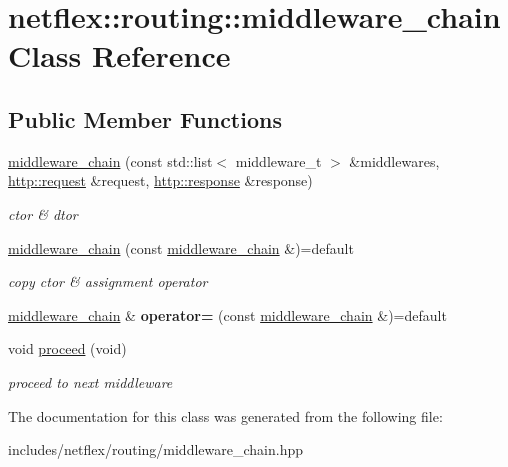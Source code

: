 \hypertarget{classnetflex_1_1routing_1_1middleware__chain}{}\section{netflex\+:\+:routing\+:\+:middleware\+\_\+chain Class Reference}
\label{classnetflex_1_1routing_1_1middleware__chain}
\subsection*{Public Member Functions}
\begin{DoxyCompactItemize}
\item 
\mbox{\label{classnetflex_1_1routing_1_1middleware__chain_a1ca46e620562de94f0f18bda55d5dc6b}} 
\hyperlink{classnetflex_1_1routing_1_1middleware__chain_a1ca46e620562de94f0f18bda55d5dc6b}{middleware\+\_\+chain} (const std\+::list$<$ middleware\+\_\+t $>$ \&middlewares, \hyperlink{classnetflex_1_1http_1_1request}{http\+::request} \&request, \hyperlink{classnetflex_1_1http_1_1response}{http\+::response} \&response)
\begin{DoxyCompactList}\small\item\em ctor \& dtor \end{DoxyCompactList}\item 
\mbox{\label{classnetflex_1_1routing_1_1middleware__chain_ae9735fec43573278a01312692c5aff55}} 
\hyperlink{classnetflex_1_1routing_1_1middleware__chain_ae9735fec43573278a01312692c5aff55}{middleware\+\_\+chain} (const \hyperlink{classnetflex_1_1routing_1_1middleware__chain}{middleware\+\_\+chain} \&)=default
\begin{DoxyCompactList}\small\item\em copy ctor \& assignment operator \end{DoxyCompactList}\item 
\mbox{\label{classnetflex_1_1routing_1_1middleware__chain_a292af104bd22249848832886cdd40587}} 
\hyperlink{classnetflex_1_1routing_1_1middleware__chain}{middleware\+\_\+chain} \& {\bfseries operator=} (const \hyperlink{classnetflex_1_1routing_1_1middleware__chain}{middleware\+\_\+chain} \&)=default
\item 
\mbox{\label{classnetflex_1_1routing_1_1middleware__chain_a762a6cce9e788dd6bb3261336d4bb841}} 
void \hyperlink{classnetflex_1_1routing_1_1middleware__chain_a762a6cce9e788dd6bb3261336d4bb841}{proceed} (void)
\begin{DoxyCompactList}\small\item\em proceed to next middleware \end{DoxyCompactList}\end{DoxyCompactItemize}


The documentation for this class was generated from the following file\+:\begin{DoxyCompactItemize}
\item 
includes/netflex/routing/middleware\+\_\+chain.\+hpp\end{DoxyCompactItemize}
